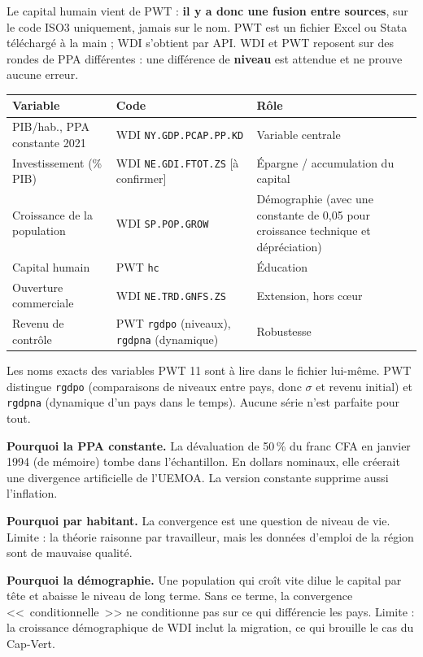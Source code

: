 \documentclass[21pt,a4paper]{article}
\newcommand{\sig}{\texorpdfstring{$\sigma$}{sigma}}
\begin{document}
	Le capital humain vient de PWT : \textbf{il y a donc une fusion entre sources}, sur le code ISO3 uniquement, jamais sur le nom. PWT est un fichier Excel ou Stata téléchargé à la main ; WDI s'obtient par API. WDI et PWT reposent sur des rondes de PPA différentes : une différence de \textbf{niveau} est attendue et ne prouve aucune erreur.
	
	\begin{center}
		\small
		\begin{tabularx}{\textwidth}{@{}L{4cm}L{5.3cm}Y@{}}
			\toprule
			\textbf{Variable} & \textbf{Code} & \textbf{Rôle} \\
			\midrule
			PIB/hab., PPA constante 2021 & WDI \texttt{NY.GDP.PCAP.PP.KD} & Variable centrale \\
			\addlinespace
			Investissement (\% PIB) & WDI \texttt{NE.GDI.FTOT.ZS} [à confirmer] & Épargne / accumulation du capital \\
			\addlinespace
			Croissance de la population & WDI \texttt{SP.POP.GROW} & Démographie (avec une constante de 0,05 pour croissance technique et dépréciation) \\
			\addlinespace
			Capital humain & PWT \texttt{hc} & Éducation \\
			\addlinespace
			Ouverture commerciale & WDI \texttt{NE.TRD.GNFS.ZS} & Extension, hors cœur \\
			\addlinespace
			Revenu de contrôle & PWT \texttt{rgdpo} (niveaux), \texttt{rgdpna} (dynamique) & Robustesse \\
			\bottomrule
		\end{tabularx}
	\end{center}
	
	Les noms exacts des variables PWT 11 sont à lire dans le fichier lui-même. PWT distingue \texttt{rgdpo} (comparaisons de niveaux entre pays, donc \sig{} et revenu initial) et \texttt{rgdpna} (dynamique d'un pays dans le temps). Aucune série n'est parfaite pour tout.
	
	\textbf{Pourquoi la PPA constante.} La dévaluation de 50\,\% du franc CFA en janvier 1994 (de mémoire) tombe dans l'échantillon. En dollars nominaux, elle créerait une divergence artificielle de l'UEMOA. La version constante supprime aussi l'inflation.
	
	\textbf{Pourquoi par habitant.} La convergence est une question de niveau de vie. Limite : la théorie raisonne par travailleur, mais les données d'emploi de la région sont de mauvaise qualité.
	
	\textbf{Pourquoi la démographie.} Une population qui croît vite dilue le capital par tête et abaisse le niveau de long terme. Sans ce terme, la convergence <<~conditionnelle~>> ne conditionne pas sur ce qui différencie les pays. Limite : la croissance démographique de WDI inclut la migration, ce qui brouille le cas du Cap-Vert.
	
\end{document}
